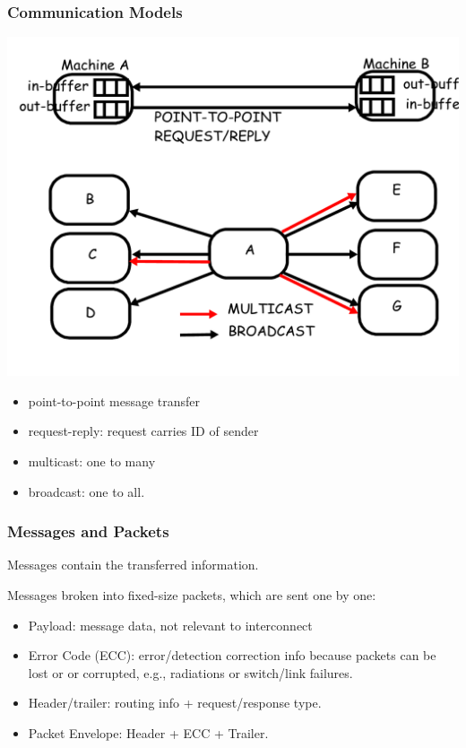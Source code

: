 \documentclass{beamer}
\newcommand{\emp}[1]{\textcolor{DikuRed}{ #1}}
\begin{document}
\begin{frame}[fragile,t]
\frametitle{Communication Models}

\includegraphics[width=47ex]{FigsInterconnect/SimpleCommun}\pause

\vspace{-2ex}
\begin{itemize}
    \item \emp{point-to-point} message transfer
    \item \emp{request-reply}: request carries ID of sender
    \item \emp{multicast}: one to many
    \item \emp{broadcast}: one to all. 
\end  {itemize}

\end{frame}


\begin{frame}[fragile,t]
\frametitle{Messages and Packets}


Messages contain the transferred information. 
\medskip

Messages broken into fixed-size packets, which are sent one by one:
 \pause

\begin{itemize}
    \item \emp{Payload}: message data, not relevant to interconnect
    \item \emp{Error Code (ECC)}: error/detection correction info because packets 
            can be lost or or corrupted, e.g., radiations or switch/link failures.
    \item \emp{Header/trailer}: routing info + request/response type.
    \item \emp{Packet Envelope}: Header + ECC + Trailer. 
\end  {itemize}

\end{frame}
\end{document}
